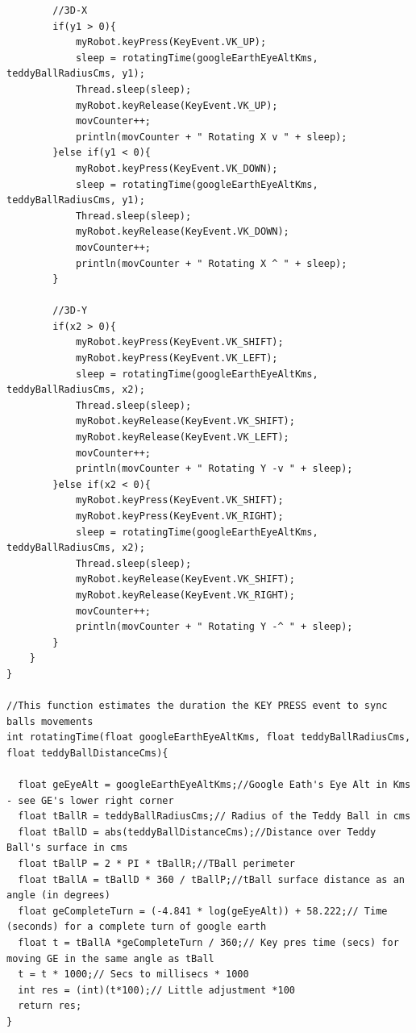 \documentclass[12pt]{article}
\begin{document}
{\begin{verbatim}
        //3D-X
        if(y1 > 0){
            myRobot.keyPress(KeyEvent.VK_UP);
            sleep = rotatingTime(googleEarthEyeAltKms, teddyBallRadiusCms, y1);
            Thread.sleep(sleep);
            myRobot.keyRelease(KeyEvent.VK_UP);
            movCounter++;
            println(movCounter + " Rotating X v " + sleep);
        }else if(y1 < 0){
            myRobot.keyPress(KeyEvent.VK_DOWN);
            sleep = rotatingTime(googleEarthEyeAltKms, teddyBallRadiusCms, y1);
            Thread.sleep(sleep);
            myRobot.keyRelease(KeyEvent.VK_DOWN);
            movCounter++;
            println(movCounter + " Rotating X ^ " + sleep);
        }

        //3D-Y
        if(x2 > 0){
            myRobot.keyPress(KeyEvent.VK_SHIFT);
            myRobot.keyPress(KeyEvent.VK_LEFT);
            sleep = rotatingTime(googleEarthEyeAltKms, teddyBallRadiusCms, x2);            
            Thread.sleep(sleep);
            myRobot.keyRelease(KeyEvent.VK_SHIFT);
            myRobot.keyRelease(KeyEvent.VK_LEFT); 
            movCounter++;
            println(movCounter + " Rotating Y -v " + sleep);
        }else if(x2 < 0){            
            myRobot.keyPress(KeyEvent.VK_SHIFT);
            myRobot.keyPress(KeyEvent.VK_RIGHT); 
            sleep = rotatingTime(googleEarthEyeAltKms, teddyBallRadiusCms, x2);            
            Thread.sleep(sleep);
            myRobot.keyRelease(KeyEvent.VK_SHIFT);
            myRobot.keyRelease(KeyEvent.VK_RIGHT); 
            movCounter++;
            println(movCounter + " Rotating Y -^ " + sleep);            
        }
    }
}

//This function estimates the duration the KEY PRESS event to sync balls movements
int rotatingTime(float googleEarthEyeAltKms, float teddyBallRadiusCms, float teddyBallDistanceCms){

  float geEyeAlt = googleEarthEyeAltKms;//Google Eath's Eye Alt in Kms - see GE's lower right corner
  float tBallR = teddyBallRadiusCms;// Radius of the Teddy Ball in cms
  float tBallD = abs(teddyBallDistanceCms);//Distance over Teddy Ball's surface in cms
  float tBallP = 2 * PI * tBallR;//TBall perimeter
  float tBallA = tBallD * 360 / tBallP;//tBall surface distance as an angle (in degrees)
  float geCompleteTurn = (-4.841 * log(geEyeAlt)) + 58.222;// Time (seconds) for a complete turn of google earth
  float t = tBallA *geCompleteTurn / 360;// Key pres time (secs) for moving GE in the same angle as tBall
  t = t * 1000;// Secs to millisecs * 1000
  int res = (int)(t*100);// Little adjustment *100
  return res;
}
\end{verbatim}
}
\end{document}
